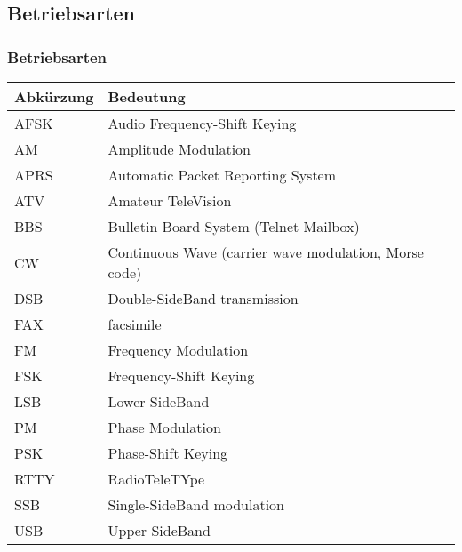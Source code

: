 \subsection*{Betriebsarten}
\begin{frame}
    \frametitle{Betriebsarten}

    \begin{center}
    \footnotesize
    \begin{tabular}{|l|l|}\hline
        \textbf{Abkürzung} & \textbf{Bedeutung}                         \\ \hline \hline
        AFSK  & Audio Frequency-Shift Keying                            \\ \hline
        AM    & Amplitude Modulation                                    \\ \hline
        APRS  & Automatic Packet Reporting System                       \\ \hline
        ATV   & Amateur TeleVision                                      \\ \hline
        BBS   & Bulletin Board System (Telnet Mailbox)                  \\ \hline
        CW    & Continuous Wave (carrier wave modulation, Morse code)   \\ \hline
        DSB   & Double-SideBand transmission                            \\ \hline
        FAX   & facsimile                                               \\ \hline
        FM    & Frequency Modulation                                    \\ \hline
        FSK   & Frequency-Shift Keying                                  \\ \hline
        LSB   & Lower SideBand                                          \\ \hline
        PM    & Phase Modulation                                        \\ \hline
        PSK   & Phase-Shift Keying                                      \\ \hline
        RTTY  & RadioTeleTYpe                                           \\ \hline
        SSB   & Single-SideBand modulation                              \\ \hline
        USB   & Upper SideBand                                          \\ \hline
    \end{tabular}
    \end{center}

\end{frame}

